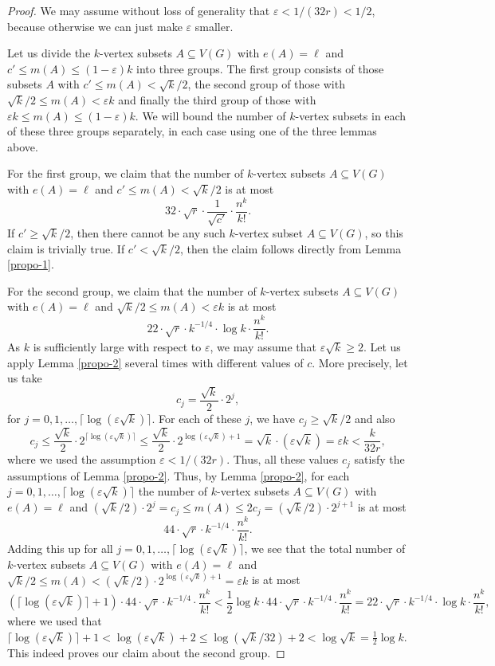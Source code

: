 \documentclass[11pt]{article}
\theoremstyle{definition}
\numberwithin{equation}{section}
\begin{document}
\begin{proof}We may assume without loss of generality that $\varepsilon<1/(32r)<1/2$, because otherwise we can just make $\varepsilon$ smaller.

Let us divide the $k$-vertex subsets $A\subseteq V(G)$ with $e(A)=\ell$ and $c' \leq m(A)\leq (1-\varepsilon) k$ into three groups. The first group consists of those subsets $A$ with $c' \leq m(A)< \sqrt{k}/2$, the second group of those with $\sqrt{k}/2\leq m(A)< \varepsilon k$ and finally the third group of those with $\varepsilon k\leq m(A)\leq (1-\varepsilon) k$. We will bound the number of $k$-vertex subsets in each of these three groups separately, in each case using one of the three lemmas above.

For the first group, we claim that the number of $k$-vertex subsets $A\subseteq V(G)$ with $e(A)=\ell$ and $c'\leq m(A)<\sqrt{k}/2$ is at most
\[32\cdot \sqrt{r}\cdot \frac{1}{\sqrt{c'}}\cdot \frac{n^k}{k!}.\]
If $c'\geq \sqrt{k}/2$, then there cannot be any such $k$-vertex subset $A\subseteq V(G)$, so this claim is trivially true. If $c'< \sqrt{k}/2$, then the claim follows directly from Lemma \ref{propo-1}.

For the second group, we claim that the number of $k$-vertex subsets $A\subseteq V(G)$ with $e(A)=\ell$ and $\sqrt{k}/2\leq m(A)< \varepsilon k$ is at most
\[22 \cdot \sqrt{r}\cdot k^{-1/4}\cdot \log k\cdot \frac{n^k}{k!}.\]
As $k$ is sufficiently large with respect to $\varepsilon$, we may assume that $\varepsilon\sqrt{k}\geq 2$. Let us apply Lemma \ref{propo-2} several times with different values of $c$. More precisely, let us take
\[c_j=\frac{\sqrt{k}}{2}\cdot 2^j,\]
for $j=0,1,\dots,\lceil \log (\varepsilon \sqrt{k})\rceil$. For each of these $j$, we have $c_j\geq \sqrt{k}/2$ and also
\[c_j\leq \frac{\sqrt{k}}{2}\cdot 2^{\lceil \log (\varepsilon \sqrt{k})\rceil}\leq \frac{\sqrt{k}}{2}\cdot 2^{\log (\varepsilon \sqrt{k})+1}=\sqrt{k}\cdot (\varepsilon \sqrt{k})=\varepsilon k<\frac{k}{32r},\]
where we used the assumption $\varepsilon<1/(32r)$. Thus, all these values $c_j$  satisfy the assumptions of Lemma \ref{propo-2}.  Thus, by Lemma \ref{propo-2}, for each $j=0,1,\dots,\lceil \log (\varepsilon \sqrt{k})\rceil$ the number of $k$-vertex subsets $A\subseteq V(G)$ with $e(A)=\ell$ and $(\sqrt{k}/2)\cdot 2^j=c_j\leq m(A)\leq 2c_j=(\sqrt{k}/2)\cdot 2^{j+1}$ is at most
\[44\cdot \sqrt{r}\cdot k^{-1/4}\cdot \frac{n^k}{k!}.\]
Adding this up for all $j=0,1,\dots,\lceil \log (\varepsilon \sqrt{k})\rceil$, we see that the total number of $k$-vertex subsets $A\subseteq V(G)$ with $e(A)=\ell$ and $\sqrt{k}/2\leq m(A)< (\sqrt{k}/2)\cdot 2^{\log (\varepsilon \sqrt{k})+1}=\varepsilon k$ is at most
\[\left(\lceil\log (\varepsilon \sqrt{k})\rceil+1\right)\cdot 44\cdot \sqrt{r}\cdot k^{-1/4}\cdot \frac{n^k}{k!}< \frac{1}{2}\log k\cdot 44\cdot \sqrt{r}\cdot k^{-1/4}\cdot \frac{n^k}{k!}=22 \cdot \sqrt{r}\cdot k^{-1/4}\cdot \log k\cdot \frac{n^k}{k!},\]
where we used that $\lceil\log (\varepsilon \sqrt{k})\rceil+1< \log (\varepsilon \sqrt{k})+2\leq \log (\sqrt{k}/32)+2<\log \sqrt{k}=\frac{1}{2}\log k$. This indeed proves our claim about the second group.


\end{proof}
\end{document}
